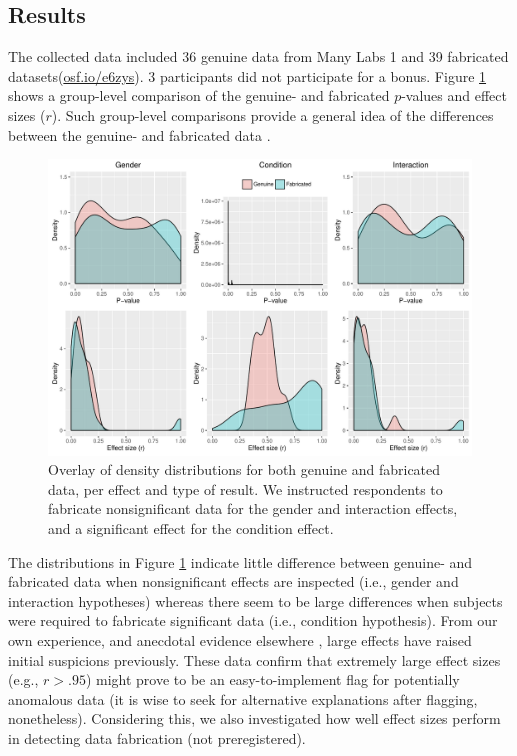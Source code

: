 \documentclass{article}
\begin{document}
\subsection*{Results}


The collected data included 36 genuine data from Many Labs 1 \citep[\url{osf.io/pqf9r};][]{klein2014} and 39 fabricated datasets(\url{osf.io/e6zys}). 3 participants did not participate for a bonus. Figure \ref{densities} shows a group-level comparison of the genuine- and fabricated $p$-values and effect sizes ($r$). Such group-level comparisons provide a general idea of the differences between the genuine- and fabricated data \citep[see also][]{Akhtar-Danesh2003}. 

\begin{figure}[!ht]
\begin{center}
\includegraphics[width=\textwidth,height=\textheight,keepaspectratio]{../figures/ddfab_density.pdf}
\caption{Overlay of density distributions for both genuine and fabricated data, per effect and type of result. We instructed respondents to fabricate nonsignificant data for the gender and interaction effects, and a significant effect for the condition effect.}
\label{densities}
\end{center}
\end{figure}

The distributions in Figure \ref{densities} indicate little difference between genuine- and fabricated data when nonsignificant effects are inspected (i.e., gender and interaction hypotheses) whereas there seem to be large differences when subjects were required to fabricate significant data (i.e., condition hypothesis). From our own experience, and anecdotal evidence elsewhere \citep{BAILEY1991741}, large effects have raised initial suspicions previously. These data confirm that extremely large effect sizes (e.g., $r>.95$) might prove to be an easy-to-implement flag for potentially anomalous data (it is wise to seek for alternative explanations after flagging, nonetheless). Considering this, we also investigated how well effect sizes perform in detecting data fabrication (not preregistered).
\end{document}
